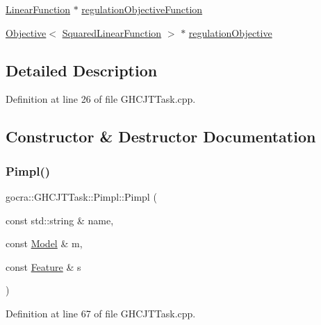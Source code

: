 \begin{DoxyCompactItemize}
\item 
\hyperlink{classocra_1_1LinearFunction}{Linear\+Function} $\ast$ \hyperlink{structgocra_1_1GHCJTTask_1_1Pimpl_a74195cf444c7ab8673985cf9cd7de28d}{regulation\+Objective\+Function}
\item 
\hyperlink{classocra_1_1Objective}{Objective}$<$ \hyperlink{classocra_1_1SquaredLinearFunction}{Squared\+Linear\+Function} $>$ $\ast$ \hyperlink{structgocra_1_1GHCJTTask_1_1Pimpl_a59fe897e1cfa0a5b28a52f0d1be7d13d}{regulation\+Objective}
\end{DoxyCompactItemize}


\subsection{Detailed Description}


Definition at line 26 of file G\+H\+C\+J\+T\+Task.\+cpp.



\subsection{Constructor \& Destructor Documentation}
\hypertarget{structgocra_1_1GHCJTTask_1_1Pimpl_ad413aad5c0e13b459b10d16dc91c8579}{}\label{structgocra_1_1GHCJTTask_1_1Pimpl_ad413aad5c0e13b459b10d16dc91c8579} 
\subsubsection{\texorpdfstring{Pimpl()}{Pimpl()}}
{\footnotesize\ttfamily gocra\+::\+G\+H\+C\+J\+T\+Task\+::\+Pimpl\+::\+Pimpl (\begin{DoxyParamCaption}\item[{const std\+::string \&}]{name,  }\item[{const \hyperlink{classocra_1_1Model}{Model} \&}]{m,  }\item[{const \hyperlink{classocra_1_1Feature}{Feature} \&}]{s }\end{DoxyParamCaption})\hspace{0.3cm}{\ttfamily [inline]}}



Definition at line 67 of file G\+H\+C\+J\+T\+Task.\+cpp.

\hypertarget{structgocra_1_1GHCJTTask_1_1Pimpl_a40a8c393004df9cb06d2cacf7a60b55f}{}\label{structgocra_1_1GHCJTTask_1_1Pimpl_a40a8c393004df9cb06d2cacf7a60b55f} 
